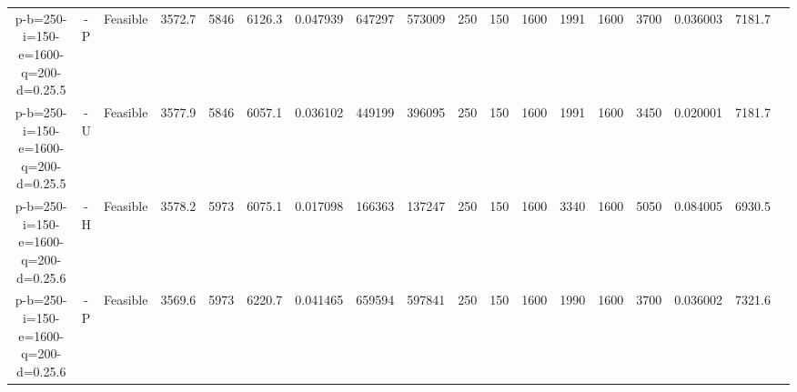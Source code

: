 \documentclass[landscape, a4paper]{article}
\begin{document}
\begin{center}
\begin{tabular}{@{}cccccccccccccccccc@{}}
p-b=250-i=150-e=1600-q=200-d=0.25.5 & -P & Feasible & 3572.7 & 5846 & 6126.3 & 0.047939 & 647297 & 573009 & 250 & 150 & 1600 & 1991 & 1600 & 3700 & 0.036003 & 7181.7 & \\
p-b=250-i=150-e=1600-q=200-d=0.25.5 & -U & Feasible & 3577.9 & 5846 & 6057.1 & 0.036102 & 449199 & 396095 & 250 & 150 & 1600 & 1991 & 1600 & 3450 & 0.020001 & 7181.7 & \\
p-b=250-i=150-e=1600-q=200-d=0.25.6 & -H & Feasible & 3578.2 & 5973 & 6075.1 & 0.017098 & 166363 & 137247 & 250 & 150 & 1600 & 3340 & 1600 & 5050 & 0.084005 & 6930.5 & \\
p-b=250-i=150-e=1600-q=200-d=0.25.6 & -P & Feasible & 3569.6 & 5973 & 6220.7 & 0.041465 & 659594 & 597841 & 250 & 150 & 1600 & 1990 & 1600 & 3700 & 0.036002 & 7321.6 & \\
\end{tabular}
\end{center}
\end{document}
